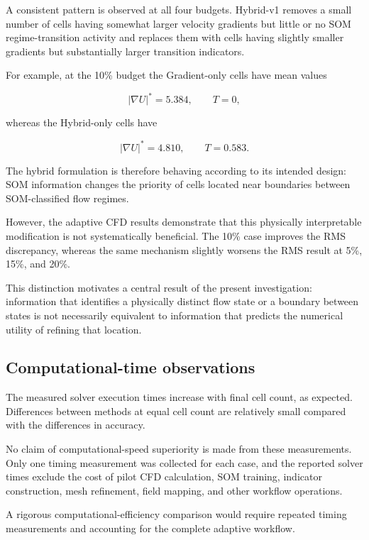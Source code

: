 A consistent pattern is observed at all four budgets. Hybrid-v1 removes a
small number of cells having somewhat larger velocity gradients but little or
no SOM regime-transition activity and replaces them with cells having
slightly smaller gradients but substantially larger transition indicators.

For example, at the 10\% budget the Gradient-only cells have mean values

\begin{equation}
|\nabla U|^{*}=5.384,
\qquad
T=0,
\end{equation}

whereas the Hybrid-only cells have

\begin{equation}
|\nabla U|^{*}=4.810,
\qquad
T=0.583.
\end{equation}

The hybrid formulation is therefore behaving according to its intended
design: SOM information changes the priority of cells located near boundaries
between SOM-classified flow regimes.

However, the adaptive CFD results demonstrate that this physically
interpretable modification is not systematically beneficial. The 10\% case
improves the RMS discrepancy, whereas the same mechanism slightly worsens the
RMS result at 5\%, 15\%, and 20\%.

This distinction motivates a central result of the present investigation:
information that identifies a physically distinct flow state or a boundary
between states is not necessarily equivalent to information that predicts
the numerical utility of refining that location.

\subsection{Computational-time observations}

The measured solver execution times increase with final cell count, as
expected. Differences between methods at equal cell count are relatively
small compared with the differences in accuracy.

No claim of computational-speed superiority is made from these measurements.
Only one timing measurement was collected for each case, and the reported
solver times exclude the cost of pilot CFD calculation, SOM training,
indicator construction, mesh refinement, field mapping, and other workflow
operations.

A rigorous computational-efficiency comparison would require repeated timing
measurements and accounting for the complete adaptive workflow.



